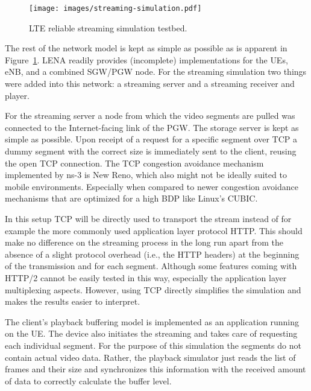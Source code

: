 \begin{figure}[htb]
	\centering
	\texttt{[image: images/streaming-simulation.pdf]}
	\caption{\acrshort{LTE} reliable streaming simulation testbed.}
\label{c6:fig:streaming-simulation}
\end{figure}

The rest of the network model is kept as simple as possible as is apparent in Figure~\ref{c6:fig:streaming-simulation}. LENA readily provides (incomplete) implementations for the \glspl{UE}, \gls{eNB}, and a combined \gls{SGW}/\gls{PGW} node. For the streaming simulation two things were added into this network: a streaming server and a streaming receiver and player.

For the streaming server a node from which the video segments are pulled was connected to the Internet-facing link of the \gls{PGW}. The storage server is kept as simple as possible. Upon receipt of a request for a specific segment over \gls{TCP} a dummy segment with the correct size is immediately sent to the client, reusing the open \gls{TCP} connection. %
The \gls{TCP} congestion avoidance mechanism implemented by ns-3 is New Reno, which also might not be ideally suited to mobile environments. Especially when compared to newer congestion avoidance mechanisms that are optimized for a high \gls{BDP} like Linux's CUBIC.

In this setup \gls{TCP} will be directly used to transport the stream instead of for example the more commonly used application layer protocol \gls{HTTP}. This should make no difference on the streaming process in the long run apart from the absence of a slight protocol overhead (i.e., the \gls{HTTP} headers) at the beginning of the transmission and for each segment. Although some features coming with \acrshort{HTTP}/2 cannot be easily tested in this way, especially the application layer multiplexing aspects. However, using \gls{TCP} directly simplifies the simulation and makes the results easier to interpret.

The client's playback buffering model is implemented as an application running on the \gls{UE}. The device also initiates the streaming and takes care of requesting each individual segment. For the purpose of this simulation the segments do not contain actual video data. Rather, the playback simulator just reads the list of frames and their size and synchronizes this information with the received amount of data to correctly calculate the buffer level.

